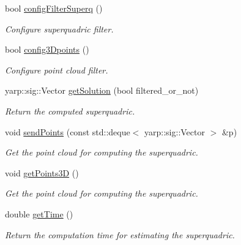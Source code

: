 \begin{DoxyCompactItemize}
\mbox{\label{classSuperqComputation_a7e3d03f909761bcf7ab70a3eeabcee23}} 
bool \mbox{\hyperlink{classSuperqComputation_a7e3d03f909761bcf7ab70a3eeabcee23}{config\+Filter\+Superq}} ()
\begin{DoxyCompactList}\small\item\em Configure superquadric filter. \end{DoxyCompactList}\item 
\mbox{\label{classSuperqComputation_a5076581260278406719f1df46fa528c7}} 
bool \mbox{\hyperlink{classSuperqComputation_a5076581260278406719f1df46fa528c7}{config3\+Dpoints}} ()
\begin{DoxyCompactList}\small\item\em Configure point cloud filter. \end{DoxyCompactList}\item 
yarp\+::sig\+::\+Vector \mbox{\hyperlink{classSuperqComputation_aa659eda30d49322192be2565f44c0fb9}{get\+Solution}} (bool filtered\+\_\+or\+\_\+not)
\begin{DoxyCompactList}\small\item\em Return the computed superquadric. \end{DoxyCompactList}\item 
void \mbox{\hyperlink{classSuperqComputation_a52c81fde3c749d05572eecd3319ac905}{send\+Points}} (const std\+::deque$<$ yarp\+::sig\+::\+Vector $>$ \&p)
\begin{DoxyCompactList}\small\item\em Get the point cloud for computing the superquadric. \end{DoxyCompactList}\item 
\mbox{\label{classSuperqComputation_a7d81b7930e2c8799dcea18745e574a2a}} 
void \mbox{\hyperlink{classSuperqComputation_a7d81b7930e2c8799dcea18745e574a2a}{get\+Points3D}} ()
\begin{DoxyCompactList}\small\item\em Get the point cloud for computing the superquadric. \end{DoxyCompactList}\item 
double \mbox{\hyperlink{classSuperqComputation_a6822767dea4b3b819f9190289d9f89a5}{get\+Time}} ()
\begin{DoxyCompactList}\small\item\em Return the computation time for estimating the superquadric. \end{DoxyCompactList}\end{DoxyCompactItemize}
